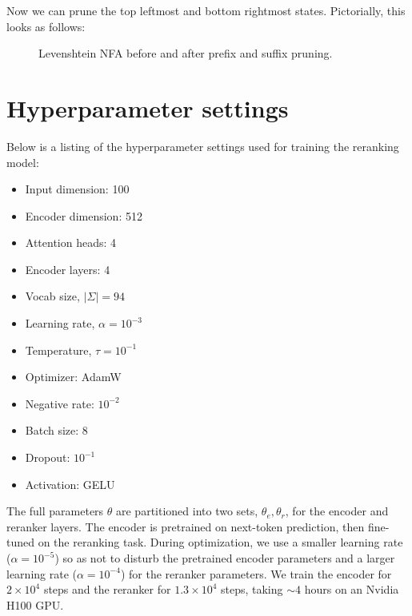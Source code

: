 \documentclass[sigplan,review,acmsmall,nonacm,screen,anonymous]{acmart}\settopmatter{printfolios=false,printccs=false,printacmref=false}
\begin{document}
\noindent Now we can prune the top leftmost and bottom rightmost states. Pictorially, this looks as follows:

\begin{figure}[H]
  \resizebox{0.47\textwidth}{!}{
    
  }
  \resizebox{0.47\textwidth}{!}{
    
  }
  \caption{Levenshtein NFA before and after prefix and suffix pruning.}
\end{figure}\vspace{-0.175cm}

\section{Hyperparameter settings}\label{sec:hyperparams}

Below is a listing of the hyperparameter settings used for training the reranking model:

\begin{multicols}{3}
\begin{itemize}
\item Input dimension: 100
\item Encoder dimension: 512
\item Attention heads: 4
\item Encoder layers: 4
\item Vocab size, $|\Sigma|= 94$
\item Learning rate, $\alpha= 10^{-3}$
\item Temperature, $\tau= 10^{-1}$
\item Optimizer: AdamW
\item Negative rate: $10^{-2}$
\item Batch size: 8
\item Dropout: $10^{-1}$
\item Activation: GELU
\end{itemize}
\end{multicols}

The full parameters $\theta$ are partitioned into two sets, $\theta_e, \theta_r$, for the encoder and reranker layers. The encoder is pretrained on next-token prediction, then fine-tuned on the reranking task. During optimization, we use a smaller learning rate ($\alpha = 10^{-5}$) so as not to disturb the pretrained encoder parameters and a larger learning rate ($\alpha = 10^{-4}$) for the reranker parameters. We train the encoder for $2\times 10^4$ steps and the reranker for $1.3 \times 10^4$ steps, taking $\sim 4$ hours on an Nvidia H100 GPU.
\end{document}
